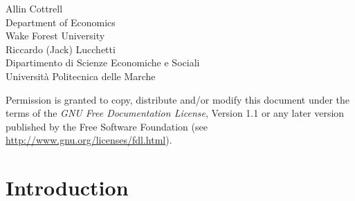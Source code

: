 \documentclass[oneside]{book}
\begin{document}
\VerbatimFootnotes

\setlength{\parindent}{0pt}
\setlength{\parskip}{1ex}
\setcounter{tocdepth}{1}


\thispagestyle{empty}

\begin{center}



{\large \sffamily
Allin Cottrell\\
Department of Economics\\
Wake Forest University\\

\vspace{20pt}
Riccardo (Jack) Lucchetti\\
Dipartimento di Scienze Economiche e Sociali\\
Università Politecnica delle Marche\\

\vspace{20pt}

}

\end{center}
\clearpage


\thispagestyle{empty}


\vspace*{2in}

Permission is granted to copy, distribute and/or modify this document
under the terms of the \emph{GNU Free Documentation License}, Version
1.1 or any later version published by the Free Software Foundation
(see \url{http://www.gnu.org/licenses/fdl.html}).

\cleardoublepage


\pagestyle{headings}

\tableofcontents

\clearpage
{}


\chapter{Introduction}
\end{document}
